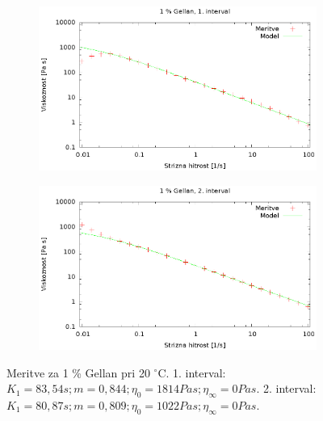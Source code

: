 \documentclass{article}
\begin{document}
\begin{figure}
	\centering
	\begin{subfigure}[b]{0.4\textwidth}
	       \includegraphics[width=\textwidth]{cross_gel1.eps}
	   \end{subfigure}
	   \begin{subfigure}[b]{0.4\textwidth}
	       \includegraphics[width=\textwidth]{cross_gel2.eps}
	   \end{subfigure}
	\caption{Meritve za 1 \% Gellan pri 20 $^\circ$C. 1. interval: $K_1 = 83,54 s; m = 0,844; \eta_0 = 1814 Pa s; \eta_\infty = 0 Pa s$. 2. interval: $K_1 = 80,87 s; m = 0,809; \eta_0 = 1022 Pa s; \eta_\infty = 0 Pa s$.}
	\label{fig:cross_gel1}
\end{figure}
\end{document}
